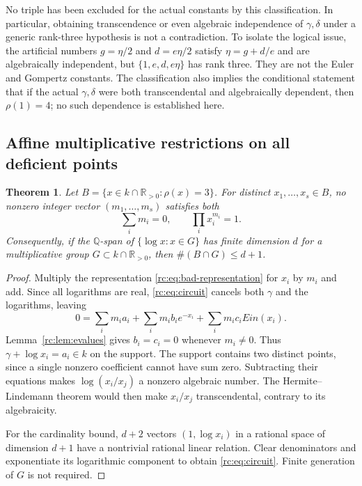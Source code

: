 \documentclass[11pt,a4paper]{article}
\newtheorem{theorem}{Theorem}[section]
\theoremstyle{definition}
\theoremstyle{remark}
\theoremstyle{plain}
\numberwithin{equation}{section}
\def\operatorname#1{#1}\def\mathrm#1{#1}}
\providecommand{\rcEin}{\operatorname{Ein}}
\providecommand{\rcQ}{\mathbb Q}
\providecommand{\rcR}{\mathbb R}
\begin{document}
No triple has been excluded for the actual constants by this
classification.  In particular, obtaining transcendence or even algebraic
independence of $\gamma,\delta$ under a generic rank-three hypothesis is
not a contradiction.  To isolate the logical issue, the artificial
numbers $g=\eta/2$ and $d=e\eta/2$ satisfy $\eta=g+d/e$ and are
algebraically independent, but $\{1,e,d,e\eta\}$ has rank three.
They are not the Euler and Gompertz constants.  The classification also
implies the conditional statement that if the actual $\gamma,\delta$
were both transcendental and algebraically dependent, then $\rho(1)=4$;
no such dependence is established here.

\subsection{Affine multiplicative restrictions on all deficient points}

\begin{theorem}\label{rc:thm:badset}
Let $B=\{x\in k\cap\rcR_{>0}:\rho(x)=3\}$.  For distinct
$x_1,\ldots,x_s\in B$, no nonzero integer vector $(m_1,\ldots,m_s)$
satisfies both
\begin{equation}\label{rc:eq:circuit}
 \sum_i m_i=0,\qquad \prod_i x_i^{m_i}=1.
\end{equation}
Consequently, if the $\rcQ$-span of $\{\log x:x\in G\}$ has finite
dimension $d$ for a multiplicative group $G\subset k\cap\rcR_{>0}$,
then $\#(B\cap G)\le d+1$.
\end{theorem}

\begin{proof}
Multiply the representation \eqref{rc:eq:bad-representation} for $x_i$
by $m_i$ and add.  Since all logarithms are real,
\eqref{rc:eq:circuit} cancels both $\gamma$ and the logarithms, leaving
\[
 0=\sum_i m_i a_i+\sum_i m_i b_i e^{-x_i}
                         +\sum_i m_i c_i\rcEin(x_i).
\]
Lemma~\ref{rc:lem:evalues} gives $b_i=c_i=0$ whenever $m_i\ne0$.
Thus $\gamma+\log x_i=a_i\in k$ on the support.  The support contains
two distinct points, since a single nonzero coefficient cannot have sum
zero.  Subtracting their equations makes $\log(x_i/x_j)$ a nonzero
algebraic number.  The Hermite--Lindemann theorem would then make
$x_i/x_j$ transcendental, contrary to its algebraicity.

For the cardinality bound, $d+2$ vectors $(1,\log x_i)$ in a rational
space of dimension $d+1$ have a nontrivial rational linear relation.
Clear denominators and exponentiate its logarithmic component to obtain
\eqref{rc:eq:circuit}.  Finite generation of $G$ is not required.
\end{proof}
\end{document}
